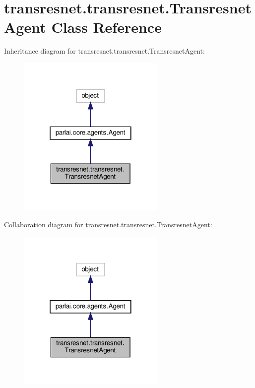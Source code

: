 \hypertarget{classtransresnet_1_1transresnet_1_1TransresnetAgent}{}\section{transresnet.\+transresnet.\+Transresnet\+Agent Class Reference}
\label{classtransresnet_1_1transresnet_1_1TransresnetAgent}


Inheritance diagram for transresnet.\+transresnet.\+Transresnet\+Agent\+:
\nopagebreak
\begin{figure}[H]
\begin{center}
\leavevmode
\includegraphics[width=202pt]{classtransresnet_1_1transresnet_1_1TransresnetAgent__inherit__graph}
\end{center}
\end{figure}


Collaboration diagram for transresnet.\+transresnet.\+Transresnet\+Agent\+:
\nopagebreak
\begin{figure}[H]
\begin{center}
\leavevmode
\includegraphics[width=202pt]{classtransresnet_1_1transresnet_1_1TransresnetAgent__coll__graph}
\end{center}
\end{figure}
